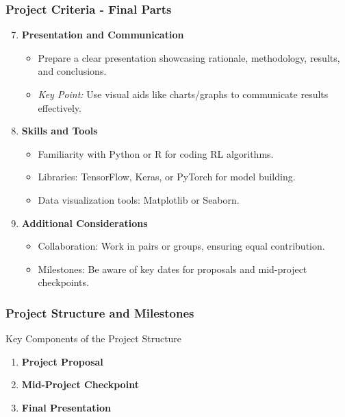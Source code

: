 \documentclass[aspectratio=169]{beamer}
\begin{document}
\begin{frame}[fragile]
    \frametitle{Project Criteria - Final Parts}
    \begin{enumerate}
        \setcounter{enumi}{6}

        \item \textbf{Presentation and Communication}
        \begin{itemize}
            \item Prepare a clear presentation showcasing rationale, methodology, results, and conclusions.
            \item \textit{Key Point:} Use visual aids like charts/graphs to communicate results effectively.
        \end{itemize}

        \item \textbf{Skills and Tools}
        \begin{itemize}
            \item Familiarity with Python or R for coding RL algorithms.
            \item Libraries: TensorFlow, Keras, or PyTorch for model building.
            \item Data visualization tools: Matplotlib or Seaborn.
        \end{itemize}

        \item \textbf{Additional Considerations}
        \begin{itemize}
            \item Collaboration: Work in pairs or groups, ensuring equal contribution.
            \item Milestones: Be aware of key dates for proposals and mid-project checkpoints.
        \end{itemize}
    \end{enumerate}
\end{frame}

\begin{frame}[fragile]
    \frametitle{Project Structure and Milestones}
    \begin{block}{Key Components of the Project Structure}
        \begin{enumerate}
            \item \textbf{Project Proposal}
            \item \textbf{Mid-Project Checkpoint}
            \item \textbf{Final Presentation}
        \end{enumerate}
    \end{block}
\end{frame}
\end{document}
